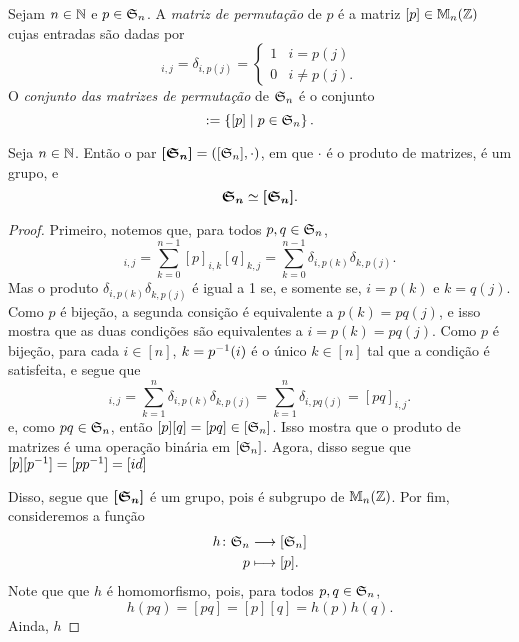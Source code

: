 \begin{definition}
	Sejam $n \in \mathbb{N}$ e $p \in \mathfrak{S}_n$. A \emph{matriz de permutação} de $p$ é a matriz $[p] \in \mathbb{M}_n (\mathbb{Z})$ cujas entradas são dadas por
	\begin{equation*}
		[p]_{i,j} = \delta_{i,p(j)} = \begin{cases}
												1 & i=p(j) \\
												0 & i \neq p(j).
												\end{cases}
	\end{equation*}
	O \emph{conjunto das matrizes de permutação} de $\mathfrak{S}_n$ é o conjunto
	\begin{equation*}
		[\sime_n] := \set{[p]}{p \in \sime_n}.
	\end{equation*}
\end{definition}

\begin{proposition}
	Seja $n \in \mathbb{N}$. Então o par $\bm{[\mathfrak{S}_n]}=([\mathfrak{S}_n],\cdot)$, em que $\cdot$ é o produto de matrizes, é um grupo, e
	\begin{equation*}
	\bm{\mathfrak{S}_n} \simeq \bm{[\mathfrak{S}_n]}.
	\end{equation*}
\end{proposition}
\begin{proof}
	Primeiro, notemos que, para todos $p,q \in \mathfrak{S}_n$,
	\begin{equation*}
	[p][q]_{i,j} = \sum_{k=0}^{n-1} [p]_{i,k}[q]_{k,j} = \sum_{k=0}^{n-1} \delta_{i,p(k)}\delta_{k,p(j)}.
	\end{equation*}
	Mas o produto $\delta_{i,p(k)}\delta_{k,p(j)}$ é igual a 1 se, e somente se, $i=p(k)$ e $k=q(j)$. Como $p$ é bijeção, a segunda consição é equivalente a $p(k)=pq(j)$, e isso mostra que as duas condições são equivalentes a $i=p(k)=pq(j)$. Como $p$ é bijeção, para cada $i \in [n]$, $k=p^{-1}(i)$ é o único $k \in [n]$ tal que a condição é satisfeita, e segue que
	\begin{equation*}
	[p][q]_{i,j} = \sum_{k=1}^n \delta_{i,p(k)}\delta_{k,p(j)} = \sum_{k=1}^n \delta_{i,pq(j)} = [pq]_{i,j}.
	\end{equation*}
e, como $pq \in \mathfrak{S}_n$, então $[p][q]=[pq] \in [\mathfrak{S}_n]$. Isso mostra que o produto de matrizes é uma operação binária em $[\mathfrak{S}_n]$. Agora, disso segue que $[p][p^{-1}]=[pp^{-1}]=[id]$





Disso, segue que $\bm{[\mathfrak{S}_n]}$ é um grupo, pois é subgrupo de $\mathbb{M}_n(\mathbb{Z})$. Por fim, consideremos a função
	\begin{align*}
	{h}\colon {\mathfrak{S}_n} &\longrightarrow {[\mathfrak{S}_n]} \\{p} &\longmapsto [p].
	\end{align*}
Note que que $h$ é homomorfismo, pois, para todos $p,q \in \mathfrak{S}_n$,
	\begin{equation*}
	h(pq) = [pq]= [p][q] = h(p)h(q).
	\end{equation*}
Ainda, $h$
\end{proof}

